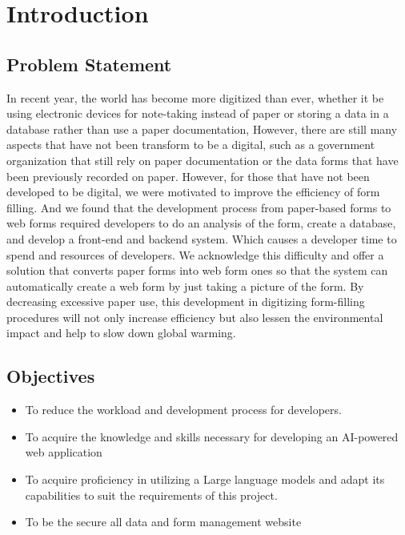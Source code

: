 \documentclass[12pt,oneside,openright,a4paper]{cpe-english-project}
\begin{document}



\chapter{Introduction}

\section{Problem Statement} 

In recent year, the world has become more digitized than ever, whether it be using electronic devices for note-taking instead of paper or storing a data in a database rather than use a paper documentation, However, there are still many aspects that have not been transform to be a digital, such as a government organization that still rely on paper documentation or  the data forms that have been previously recorded on paper. However, for those that have not been developed to be digital, we were motivated to improve the efficiency of form filling. And we found that the development process from paper-based forms to web forms required developers to do an analysis of the form, create a database, and develop a front-end and backend system. Which causes a developer time to spend and resources of developers. We acknowledge this difficulty and offer a solution that converts paper forms into web form ones so that the system can automatically create a web form by just taking a picture of the form. By decreasing excessive paper use, this development in digitizing form-filling procedures will not only increase efficiency but also lessen the environmental impact and help to slow down global warming.

\section{Objectives}
\begin{itemize}
\item   To reduce the workload and development process for developers. 
\item   To acquire the knowledge and skills necessary for developing an AI-powered web
application
\item To acquire proficiency in utilizing a Large language models and adapt its capabilities to suit the
requirements of this project.
\item  To be the secure all data and form management website
\end{itemize}
\end{document}
